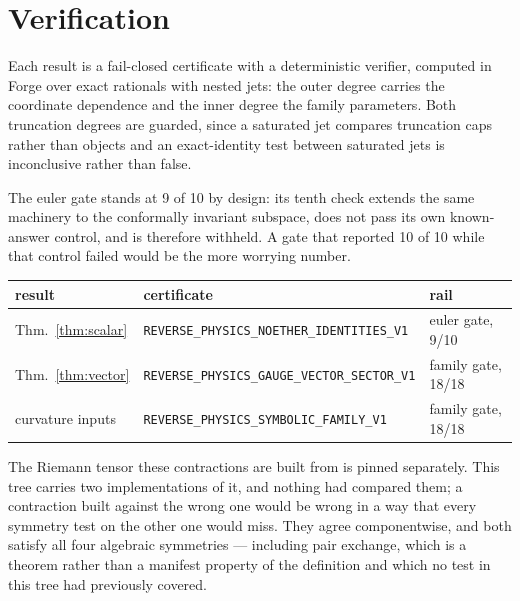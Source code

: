 \documentclass[11pt]{article}
\theoremstyle{definition}
\theoremstyle{remark}
\newcommand{\cert}[1]{\nolinkurl{#1}}
\begin{document}
\section{Verification}
\label{sec:verification}

Each result is a fail-closed certificate with a deterministic verifier, computed
in Forge over exact rationals with nested jets: the outer degree carries the
coordinate dependence and the inner degree the family parameters.  Both
truncation degrees are guarded, since a saturated jet compares truncation caps
rather than objects and an exact-identity test between saturated jets is
inconclusive rather than false.

The euler gate stands at 9 of 10 by design: its tenth check extends the same
machinery to the conformally invariant subspace, does not pass its own
known-answer control, and is therefore withheld.  A gate that reported 10 of 10
while that control failed would be the more worrying number.

\begin{center}
\begin{tabularx}{\textwidth}{@{}lYl@{}}
\toprule
result & certificate & rail \\
\midrule
Thm.~\ref{thm:scalar} & \cert{REVERSE\_PHYSICS\_NOETHER\_IDENTITIES\_V1}   & euler gate, 9/10 \\
Thm.~\ref{thm:vector} & \cert{REVERSE\_PHYSICS\_GAUGE\_VECTOR\_SECTOR\_V1} & family gate, 18/18 \\
curvature inputs      & \cert{REVERSE\_PHYSICS\_SYMBOLIC\_FAMILY\_V1}      & family gate, 18/18 \\
\bottomrule
\end{tabularx}
\end{center}

The Riemann tensor these contractions are built from is pinned separately.  This
tree carries two implementations of it, and nothing had compared them; a
contraction built against the wrong one would be wrong in a way that every
symmetry test on the other one would miss.  They agree componentwise, and both
satisfy all four algebraic symmetries --- including pair exchange, which is a
theorem rather than a manifest property of the definition and which no test in
this tree had previously covered.
\end{document}
